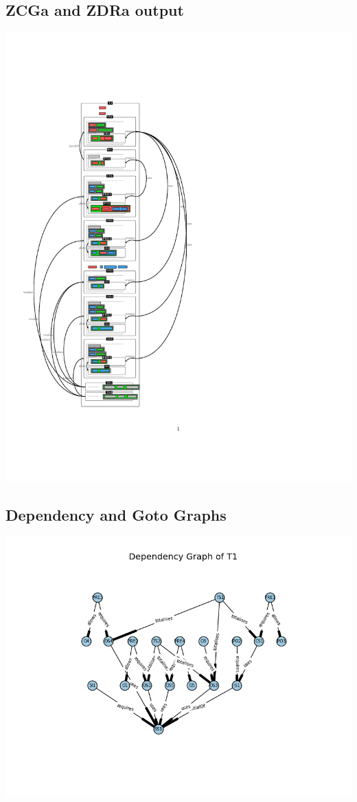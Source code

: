 \subsection{ZCGa and ZDRa output}
\label{app:bb1n2o}
\noindent \includegraphics[clip, trim=0cm 4cm 6cm 4.2cm]{examples/bb/1n2comp.pdf}

\subsection{Dependency and Goto Graphs}
\label{app:bb2.5}
\includegraphics[scale=0.7]{examples/bb/25a.png}

